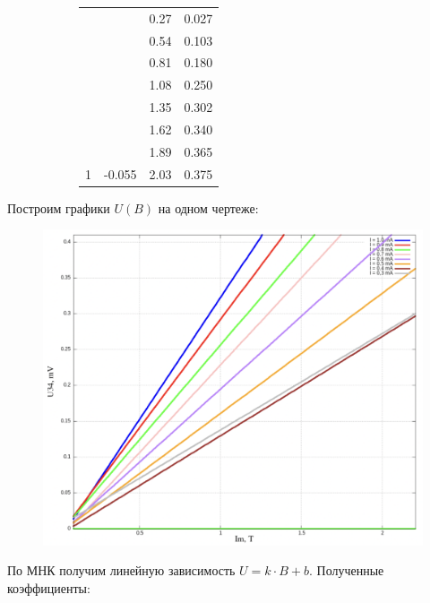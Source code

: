 \documentclass[11pt]{article}
\begin{document}
\begin{figure}[H]
\begin{subfigure}{.5\textwidth}
\begin{tabular}{|c|c|c|c|}
        & & 0.27 & 0.027  \\ 
        & & 0.54 & 0.103  \\ 
        & & 0.81 & 0.180  \\ 
        & & 1.08 & 0.250  \\ 
        & & 1.35 & 0.302  \\ 
        & & 1.62 & 0.340  \\ 
        & & 1.89 & 0.365  \\ 
        \multirow{-8}{*}{1}           & \multirow{-8}{*}{-0.055}       & 2.03 & 0.375 \\\hline
        \end{tabular}
    \end{subfigure}%
\end{figure}

Построим графики \(U(B)\) на одном чертеже:

\begin{figure}[H]
    \centering
    \includegraphics[width=\textwidth]{graf2.png}
\end{figure}
    

По МНК получим линейную зависимость \( U = k \cdot B + b \). Полученные коэффициенты:
\end{document}
